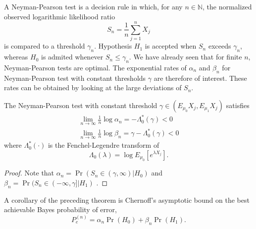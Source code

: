 A Neyman-Pearson test is a decision rule in which, for any $n \in \mathbb{N}$, the normalized observed logarithmic likelihood ratio
\begin{equation*}
S_n = \frac{1}{n} \sum_{j=1}^n X_j
\end{equation*}
is compared to a threshold $\gamma_n$.
Hypothesis $H_1$ is accepted when $S_n$ exceeds $\gamma_n$, whereas $H_0$ is admited whenever $S_n \leq \gamma_n$.
We have already seen that for finite $n$, Neyman-Pearson tests are optimal.
The exponential rates of $\alpha_n$ and $\beta_n$ for Neyman-Pearson test with constant thresholds $\gamma$ are therefore of interest.
These rates can be obtained by looking at the large deviations of $S_n$.

\begin{theorem} \label{theorem:AsymptoticHypothesisTesting}
The Neyman-Pearson test with constant threshold $\gamma \in (E_{\mu_0} X_j, E_{\mu_1} X_j)$ satisfies
\begin{align*}
\lim_{n \rightarrow \infty} \frac{1}{n} \log \alpha_n = - \Lambda_0^* (\gamma) < 0 \\
\lim_{n \rightarrow \infty} \frac{1}{n} \log \beta_n = \gamma - \Lambda_0^* (\gamma) < 0
\end{align*}
where $\Lambda_0^* (\cdot)$ is the Fenchel-Legendre transform of
\begin{equation*}
\Lambda_0 (\lambda) = \log E_{\mu_0} \left[ e^{\lambda X_j} \right] .
\end{equation*}
\end{theorem}

\begin{proof}
Note that $\alpha_n = \Pr (S_n \in (\gamma, \infty) | H_0)$ and $\beta_n = \Pr (S_n \in (-\infty, \gamma] | H_1)$ .
\end{proof}

A corollary of the preceding theorem is Chernoff's asymptotic bound on the best achievable Bayes probability of error,
\begin{equation*}
P_e^{(n)} = \alpha_n \Pr (H_0) + \beta_n \Pr (H_1) .
\end{equation*}


